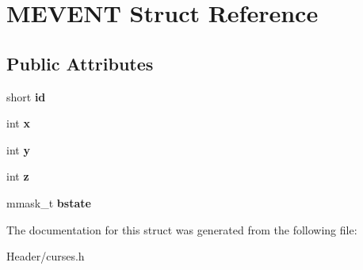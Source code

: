 \hypertarget{structMEVENT}{}\section{M\+E\+V\+E\+NT Struct Reference}
\label{structMEVENT}
\subsection*{Public Attributes}
\begin{DoxyCompactItemize}
\item 
\mbox{\label{structMEVENT_a6726bcace48289837d10f6ddbcb902a3}} 
short {\bfseries id}
\item 
\mbox{\label{structMEVENT_a58110c8f68669065b1e069a6a48acb48}} 
int {\bfseries x}
\item 
\mbox{\label{structMEVENT_a605ac62b477c11e0306b1f41c5bef8cf}} 
int {\bfseries y}
\item 
\mbox{\label{structMEVENT_a8bbc5d4b1bf90ed7e13e2e8d7c1360c1}} 
int {\bfseries z}
\item 
\mbox{\label{structMEVENT_af9cbb432b2527c3a5659b0667682f1ea}} 
mmask\+\_\+t {\bfseries bstate}
\end{DoxyCompactItemize}


The documentation for this struct was generated from the following file\+:\begin{DoxyCompactItemize}
\item 
Header/curses.\+h\end{DoxyCompactItemize}
